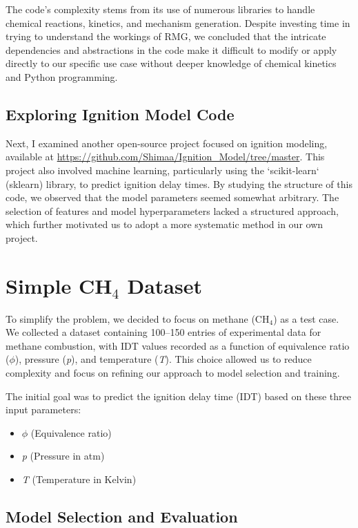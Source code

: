 \documentclass[12pt]{report}
\begin{document}
The code's complexity stems from its use of numerous libraries to handle chemical reactions, kinetics, and mechanism generation. Despite investing time in trying to understand the workings of RMG, we concluded that the intricate dependencies and abstractions in the code make it difficult to modify or apply directly to our specific use case without deeper knowledge of chemical kinetics and Python programming.

\subsection{Exploring Ignition Model Code}

Next, I examined another open-source project focused on ignition modeling, available at \url{https://github.com/Shimaa/Ignition_Model/tree/master}. This project also involved machine learning, particularly using the `scikit-learn` (sklearn) library, to predict ignition delay times. By studying the structure of this code, we observed that the model parameters seemed somewhat arbitrary. The selection of features and model hyperparameters lacked a structured approach, which further motivated us to adopt a more systematic method in our own project.

\section{Simple CH\(_4\) Dataset}

To simplify the problem, we decided to focus on methane (CH\(_4\)) as a test case. We collected a dataset containing 100–150 entries of experimental data for methane combustion, with IDT values recorded as a function of equivalence ratio (\(\phi\)), pressure (\textit{p}), and temperature (\textit{T}). This choice allowed us to reduce complexity and focus on refining our approach to model selection and training.

The initial goal was to predict the ignition delay time (IDT) based on these three input parameters: 
\begin{itemize}
    \item \(\phi\) (Equivalence ratio)
    \item \textit{p} (Pressure in atm)
    \item \textit{T} (Temperature in Kelvin)
\end{itemize}

\subsection{Model Selection and Evaluation}
\end{document}
